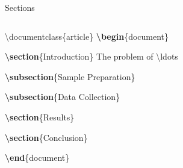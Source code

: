 \documentclass[,aspectratio=43]{beamer}
\newcommand{\VERB}{\Verb[commandchars=\\\{\}]}
\newenvironment{Shaded}{\begin{snugshade}}{\end{snugshade}}
\newcommand{\BuiltInTok}[1]{#1}
\newcommand{\ExtensionTok}[1]{#1}
\newcommand{\FunctionTok}[1]{\textcolor[rgb]{0.02,0.16,0.49}{#1}}
\newcommand{\KeywordTok}[1]{\textcolor[rgb]{0.00,0.44,0.13}{\textbf{#1}}}
\newcommand{\NormalTok}[1]{#1}
\providecommand{\tightlist}{%
  \setlength{\itemsep}{0pt}\setlength{\parskip}{0pt}}
\begin{document}
\begin{frame}[fragile]{Sections}
\protect\hypertarget{sections}{}

\begin{columns}[T]
\begin{column}{0.53\textwidth}
\small
\vspace{-1em}

\begin{Shaded}
\begin{Highlighting}[]
\BuiltInTok{\textbackslash{}documentclass}\NormalTok{\{}\ExtensionTok{article}\NormalTok{\} }
\KeywordTok{\textbackslash{}begin}\NormalTok{\{}\ExtensionTok{document}\NormalTok{\}}

\KeywordTok{\textbackslash{}section}\NormalTok{\{Introduction\}}
\NormalTok{The problem of }\FunctionTok{\textbackslash{}ldots} 

\KeywordTok{\textbackslash{}subsection}\NormalTok{\{Sample Preparation\} }

\KeywordTok{\textbackslash{}subsection}\NormalTok{\{Data Collection\}}

\KeywordTok{\textbackslash{}section}\NormalTok{\{Results\}}

\KeywordTok{\textbackslash{}section}\NormalTok{\{Conclusion\}}

\KeywordTok{\textbackslash{}end}\NormalTok{\{}\ExtensionTok{document}\NormalTok{\}}
\end{Highlighting}
\end{Shaded}
\end{column}


\end{columns}
\end{frame}
\end{document}
